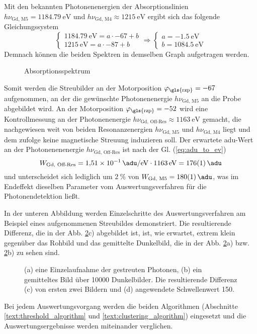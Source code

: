 \noindent
Mit den bekannten Photonenenergien der Absorptionslinien $h\nu_\text{Gd, M5} = \SI{1184,79}{\eV}$ und $h\nu_\text{Gd, M4} \approx \SI{1215}{\eV}$ ergibt sich das folgende Gleichungssystem
\begin{equation}
    \begin{cases}
    \SI{1184,79}{\eV} = a\cdot \num{-67} + b\\
    \SI{1215}{\eV} = a\cdot \num{-87} + b
    \end{cases}
    \Rightarrow
    \begin{cases}
    a = \SI{-1,5}{\eV}\\
    b = \SI{1084,5}{\eV}
    \end{cases}
    \label{eq:rzp_phi_to_ev}
\end{equation}
\noindent
Demnach können die beiden Spektren in demselben Graph aufgetragen werden.
\begin{figure}[H]
    \centering
    
    \caption{Absorptionsspektrum }
    \label{fig:rzp_phi_ev}
\end{figure}
\noindent
Somit werden die Streubilder an der Motorposition $\varphi_\text{\gls{rzp}} = \num{-67}$ aufgenommen, an der die gewünschte Photonenenergie $h\nu_\text{Gd, M5}$ an die Probe abgebildet wird. An der Motorposition $\varphi_\text{\gls{rzp}} = \num{-52}$ wird eine Kontrollmessung an der Photonenenergie $h\nu_\text{Gd, Off-Res} \approx \SI{1163}{\eV}$ gemacht, die nachgewiesen weit von beiden Resonanzenergien $h\nu_\text{Gd, M5}$ und $h\nu_\text{Gd, M4}$ liegt und dem zufolge keine magnetische Streuung induzieren soll. Der erwartete \gls{adu}-Wert an der Photonenenenergie $h\nu_\text{Gd, Off-Res}$ ist nach der Gl. (\ref{eq:adu_to_ev})
\begin{equation}
    W_\text{Gd, Off-Res} = \SI{1,51e-1}{\adu\per\eV} \cdot \SI{1163}{\eV} = \SI{176(1)}{\adu}
\end{equation}
und unterscheidet sich lediglich um $\SI{2}{\percent}$ von $W_\text{Gd, M5} = \SI{180(1)}{\adu}$, was im Endeffekt dieselben Parameter vom Auswertungsverfahren für die Photonendetektion ließt.

\noindent
In der unteren Abbildung werden Einzelschritte des Auswertungsverfahren am Beispiel eines aufgenommenen Streubildes demonstriert. 
Die resultierende Differenz, die in der Abb. \ref{fig:capture_ped_diff}c) abgebildet ist, ist, wie erwartet, extrem klein gegenüber das Rohbild und das gemittelte Dunkelbild, die in der Abb. \ref{fig:capture_ped_diff}a) bzw. \ref{fig:capture_ped_diff}b) zu sehen sind. 
\begin{figure}[H]
    \centering
    
    \caption{(a) eine Einzelaufnahme der gestreuten Photonen, (b) ein gemitteltes Bild über \num{10000} Dunkelbilder.  Die resultierende Differenz (c) von ersten zwei Bildern und (d) angewendete Schwellenwert \SI{150}{\adu}.}
    \label{fig:capture_ped_diff}
\end{figure}
\noindent
Bei jedem Auswertungsvorgang werden die beiden Algorithmen (Abschnitte \ref{text:threshold_algorithm} und \ref{text:clustering_algorithm}) eingesetzt und die Auswertungsergebnisse werden miteinander verglichen. 
